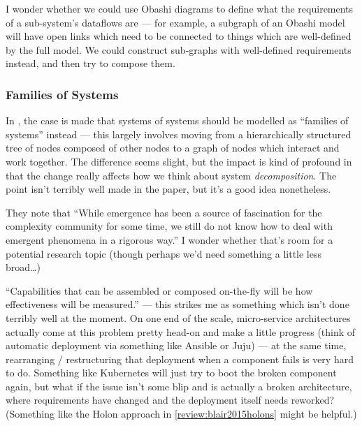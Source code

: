 \documentclass[12pt]{article}
\begin{document}
I wonder whether we could use Obashi diagrams to define what the requirements of
a sub-system's dataflows are --- for example, a subgraph of an Obashi model will
have open links which need to be connected to things which are well-defined by
the full model. We could construct sub-graphs with well-defined requirements
instead, and then try to compose them.\par

\subsubsection{Families of Systems}

In \cite{meilich2006system}, the case is made that systems of systems should be
modelled as ``families of systems'' instead --- this largely involves moving
from a hierarchically structured tree of nodes composed of other nodes to a
graph of nodes which interact and work together. The difference seems slight,
but the impact is kind of profound in that the change really affects how we
think about system \emph{decomposition}. The point isn't terribly well made in
the paper, but it's a good idea nonetheless.\par

They note that ``While emergence has been a source of fascination for the
complexity community for some time, we still do not know how to deal with
emergent phenomena in a rigorous way.'' I wonder whether that's room for a
potential research topic (though perhaps we'd need something a little less broad\ldots)\par

``Capabilities that can be assembled or composed on-the-fly will be how
effectiveness will be measured.'' --- this strikes me as something which isn't
done terribly well at the moment. On one end of the scale, micro-service
architectures actually come at this problem pretty head-on and make a little
progress (think of automatic deployment via something like Ansible or Juju) ---
at the same time, rearranging / restructuring that deployment when a component
fails is very hard to do. Something like Kubernetes will just try to boot the
broken component again, but what if the issue isn't some blip and is actually a
broken architecture, where requirements have changed and the deployment itself
needs reworked? (Something like the Holon approach in
\cref{review:blair2015holons} might be helpful.)\par
\end{document}
